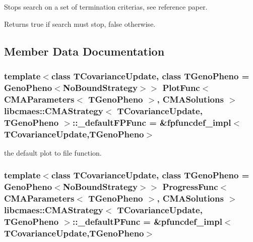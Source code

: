 Stops search on a set of termination criterias, see reference paper. 

\begin{DoxyReturn}{Returns}
true if search must stop, false otherwise. 
\end{DoxyReturn}


\subsection{Member Data Documentation}
\hypertarget{classlibcmaes_1_1CMAStrategy_a0fcdccd9451a2dc509ee651f664ac31f}{
\subsubsection[{\+\_\+default\+F\+P\+Func}]{\setlength{\rightskip}{0pt plus 5cm}template$<$class T\+Covariance\+Update, class T\+Geno\+Pheno  = Geno\+Pheno$<$\+No\+Bound\+Strategy$>$$>$ Plot\+Func$<$ {\bf C\+M\+A\+Parameters}$<$ T\+Geno\+Pheno $>$, {\bf C\+M\+A\+Solutions} $>$ {\bf libcmaes\+::\+C\+M\+A\+Strategy}$<$ T\+Covariance\+Update, T\+Geno\+Pheno $>$\+::\+\_\+default\+F\+P\+Func = \&fpfuncdef\+\_\+impl$<$T\+Covariance\+Update,T\+Geno\+Pheno$>$\hspace{0.3cm}{\ttfamily [static]}}}\label{classlibcmaes_1_1CMAStrategy_a0fcdccd9451a2dc509ee651f664ac31f}
the default plot to file function. \hypertarget{classlibcmaes_1_1CMAStrategy_af6d980c670eef47ee810645739999d5b}{
\subsubsection[{\+\_\+default\+P\+Func}]{\setlength{\rightskip}{0pt plus 5cm}template$<$class T\+Covariance\+Update, class T\+Geno\+Pheno  = Geno\+Pheno$<$\+No\+Bound\+Strategy$>$$>$ Progress\+Func$<$ {\bf C\+M\+A\+Parameters}$<$ T\+Geno\+Pheno $>$, {\bf C\+M\+A\+Solutions} $>$ {\bf libcmaes\+::\+C\+M\+A\+Strategy}$<$ T\+Covariance\+Update, T\+Geno\+Pheno $>$\+::\+\_\+default\+P\+Func = \&pfuncdef\+\_\+impl$<$T\+Covariance\+Update,T\+Geno\+Pheno$>$\hspace{0.3cm}{\ttfamily [static]}}}\label{classlibcmaes_1_1CMAStrategy_af6d980c670eef47ee810645739999d5b}

